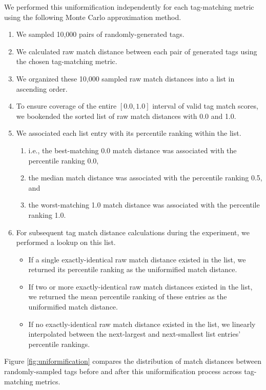 We performed this uniformification independently for each tag-matching metric using the following Monte Carlo approximation method.
\begin{enumerate}
\item We sampled 10,000 pairs of randomly-generated tags.
\item We calculated raw match distance between each pair of generated tags using the chosen tag-matching metric.
\item We organized these 10,000 sampled raw match distances into a list in ascending order.
\item To ensure coverage of the entire $[0.0,1.0]$ interval of valid tag match scores, we bookended the sorted list of raw match distances with 0.0 and 1.0.
\item We associated each list entry with its percentile ranking within the list.
\begin{enumerate}
    \item i.e., the best-matching 0.0 match distance was associated with the percentile ranking 0.0,
    \item the median match distance was associated with the percentile ranking 0.5, and
    \item the worst-matching 1.0 match distance was associated with the percentile ranking 1.0.
\end{enumerate}
\item For subsequent tag match distance calculations during the experiment, we performed a lookup on this list.
\begin{itemize}
    \item If a single exactly-identical raw match distance existed in the list, we returned its percentile ranking as the uniformified match distance.
    \item If two or more exactly-identical raw match distances existed in the list, we returned the mean percentile ranking of these entries as the uniformified match distance.
    \item If no exactly-identical raw match distance existed in the list, we linearly interpolated between the next-largest and next-smallest list entries' percentile rankings.
\end{itemize}
\end{enumerate}
Figure \ref{fig:uniformification} compares the distribution of match distances between randomly-sampled tags before and after this uniformification process across tag-matching metrics.


